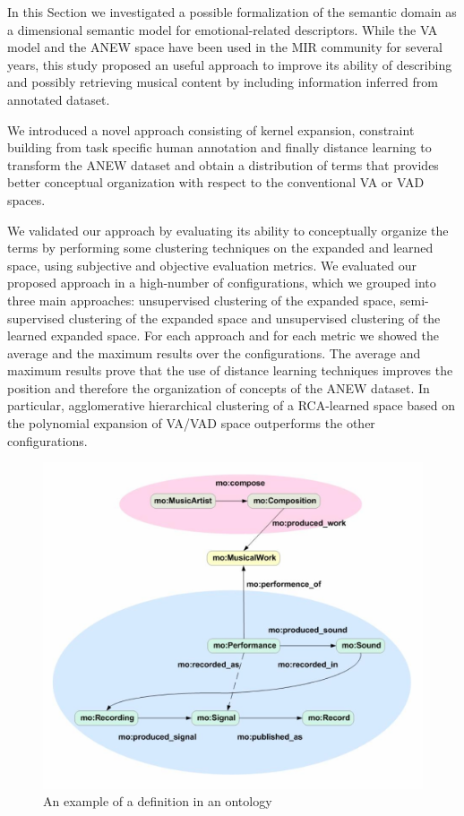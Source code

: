 In this Section we investigated a possible formalization of the semantic domain as a dimensional semantic model for emotional-related descriptors. While the VA model and the ANEW space have been used in the MIR community for several years, this study proposed an useful approach to improve its ability of describing and possibly retrieving musical content by including information inferred from annotated dataset.

We introduced a novel approach consisting of kernel expansion, constraint building from task specific human annotation and finally distance learning to transform the ANEW dataset and obtain a distribution of terms that provides better conceptual organization with respect to the conventional VA or VAD spaces.

We validated our approach by evaluating its ability to conceptually organize the terms by performing some clustering techniques on the expanded and learned space, using subjective and objective evaluation metrics. We evaluated our proposed approach in a high-number of configurations, which we grouped into three main approaches: unsupervised clustering of the expanded space, semi-supervised clustering of the expanded space and unsupervised clustering of the learned expanded space. For each approach and for each metric we showed 
the average and the maximum results over the configurations. The average and maximum results prove that the use of distance learning techniques improves the position and therefore the organization of concepts of the ANEW dataset. In particular, agglomerative hierarchical clustering of a RCA-learned space based on the polynomial expansion of VA/VAD space outperforms the other configurations. 




\begin{figure}[bt] 
	\centering 
	\includegraphics[width=\textwidth]{img/HLFs/ontology.pdf}
	\caption{An example of a definition in an ontology \cite{Raimond2007}}
	\label{fig:HLFs:ontology}
\end{figure}	

